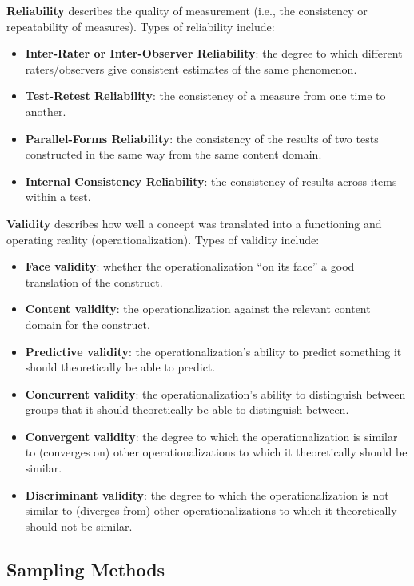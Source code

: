\documentclass[]{book}
\providecommand{\tightlist}{%
  \setlength{\itemsep}{0pt}\setlength{\parskip}{0pt}}
\begin{document}
\textbf{Reliability} describes the quality of measurement (i.e., the consistency or repeatability of measures). Types of reliability include:

\begin{itemize}
\tightlist
\item
  \textbf{Inter-Rater or Inter-Observer Reliability}: the degree to which different raters/observers give consistent estimates of the same phenomenon.
\item
  \textbf{Test-Retest Reliability}: the consistency of a measure from one time to another.
\item
  \textbf{Parallel-Forms Reliability}: the consistency of the results of two tests constructed in the same way from the same content domain.
\item
  \textbf{Internal Consistency Reliability}: the consistency of results across items within a test.
\end{itemize}

\textbf{Validity} describes how well a concept was translated into a functioning and operating reality (operationalization). Types of validity include:

\begin{itemize}
\tightlist
\item
  \textbf{Face validity}: whether the operationalization ``on its face'' a good translation of the construct.
\item
  \textbf{Content validity}: the operationalization against the relevant content domain for the construct.
\item
  \textbf{Predictive validity}: the operationalization's ability to predict something it should theoretically be able to predict.
\item
  \textbf{Concurrent validity}: the operationalization's ability to distinguish between groups that it should theoretically be able to distinguish between.
\item
  \textbf{Convergent validity}: the degree to which the operationalization is similar to (converges on) other operationalizations to which it theoretically should be similar.
\item
  \textbf{Discriminant validity}: the degree to which the operationalization is not similar to (diverges from) other operationalizations to which it theoretically should not be similar.
\end{itemize}

\hypertarget{sampling-methods}{%
\subsection{Sampling Methods}\label{sampling-methods}}
\end{document}
